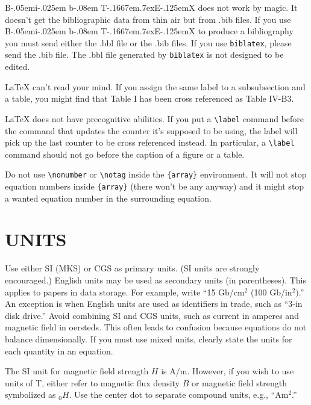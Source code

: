 \documentclass{IEEEoj}
\def\BibTeX{{\rm B\kern-.05em{\sc i\kern-.025em b}\kern-.08em
    T\kern-.1667em\lower.7ex\hbox{E}\kern-.125emX}}
\begin{document}
{\BibTeX} does not work by magic. It doesn't get the bibliographic
data from thin air but from .bib files. If you use {\BibTeX} to produce a
bibliography you must send either the .bbl file or the .bib files.
If you use \texttt{biblatex}, please send the .bib file. The .bbl file
generated by \texttt{biblatex} is not designed to be edited.

{\LaTeX} can't read your mind. If you assign the same label to a
subsubsection and a table, you might find that Table I has been cross
referenced as Table IV-B3.

{\LaTeX} does not have precognitive abilities. If you put a
\verb|\label| command before the command that updates the counter it's
supposed to be using, the label will pick up the last counter to be
cross referenced instead. In particular, a \verb|\label| command
should not go before the caption of a figure or a table.

Do not use \verb|\nonumber| or \verb|\notag| inside the \verb|{array}| environment. It
will not stop equation numbers inside \verb|{array}| (there won't be
any anyway) and it might stop a wanted equation number in the
surrounding equation.

\section{UNITS}
Use either SI (MKS) or CGS as primary units. (SI units are strongly 
encouraged.) English units may be used as secondary units (in parentheses). 
This applies to papers in data storage. For example, write ``15 Gb/cm$^{2}$ 
(100 Gb/in$^{2})$.'' An exception is when English units are used as 
identifiers in trade, such as ``3\textonehalf -in disk drive.'' Avoid 
combining SI and CGS units, such as current in amperes and magnetic field in 
oersteds. This often leads to confusion because equations do not balance 
dimensionally. If you must use mixed units, clearly state the units for each 
quantity in an equation.

The SI unit for magnetic field strength $H$ is A/m. However, if you wish to use 
units of T, either refer to magnetic flux density $B$ or magnetic field 
strength symbolized as \textmu $_{0}H$. Use the center dot to separate 
compound units, e.g., ``A\textbullet m$^{2}$.''
\end{document}
